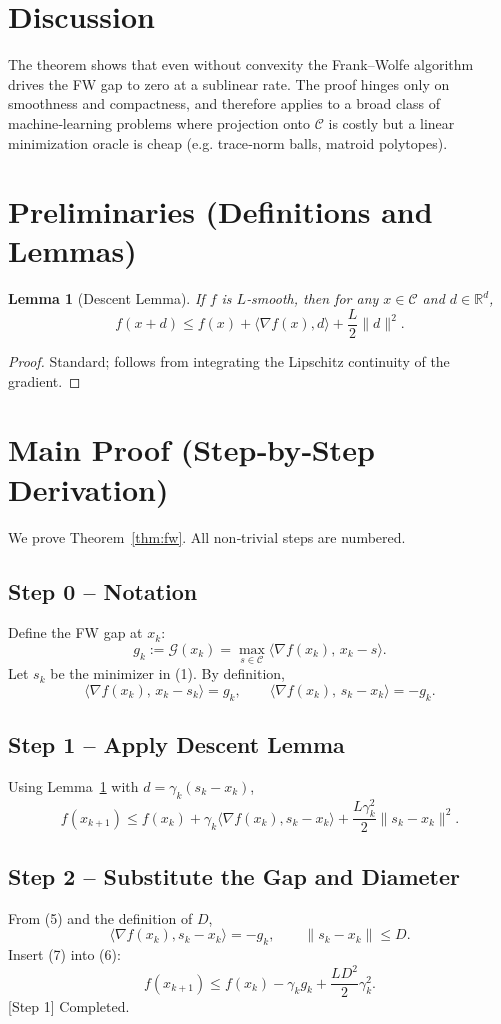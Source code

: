 \documentclass{article}
\newtheorem{lemma}{Lemma}
\newcommand{\gap}{\mathcal{G}}
\begin{document}
\section*{Discussion}
The theorem shows that even without convexity the Frank–Wolfe algorithm
drives the FW gap to zero at a sublinear rate.  The proof hinges only on
smoothness and compactness, and therefore applies to a broad class of
machine‑learning problems where projection onto $\mathcal{C}$ is costly but
a linear minimization oracle is cheap (e.g. trace‑norm balls, matroid
polytopes).

\section*{Preliminaries (Definitions and Lemmas)}
\begin{lemma}[Descent Lemma]\label{lem:descent}
If $f$ is $L$‑smooth, then for any $x\in\mathcal{C}$ and $d\in\mathbb{R}^d$,
\[
f(x+d)\le f(x)+\langle\nabla f(x),d\rangle+\frac{L}{2}\|d\|^{2}.
\]
\end{lemma}
\begin{proof}
Standard; follows from integrating the Lipschitz continuity of the gradient.
\end{proof}

\section*{Main Proof (Step‑by‑Step Derivation)}
We prove Theorem~\ref{thm:fw}.  All non‑trivial steps are numbered.

\subsection*{Step 0 – Notation}
Define the FW gap at $x_k$:
\[
g_k := \gap(x_k)=\max_{s\in\mathcal{C}}\langle \nabla f(x_k),\,x_k-s\rangle .
\tag{4}
\]
Let $s_k$ be the minimizer in (1).  By definition,
\[
\langle \nabla f(x_k),\,x_k-s_k\rangle = g_k,
\qquad
\langle \nabla f(x_k),\,s_k-x_k\rangle = -g_k .
\tag{5}
\]

\subsection*{Step 1 – Apply Descent Lemma}
Using Lemma~\ref{lem:descent} with $d = \gamma_k(s_k-x_k)$,
\[
f(x_{k+1})\le f(x_k)+\gamma_k\langle\nabla f(x_k),s_k-x_k\rangle
               +\frac{L\gamma_k^{2}}{2}\|s_k-x_k\|^{2}.
\tag{6}
\]

\subsection*{Step 2 – Substitute the Gap and Diameter}
From (5) and the definition of $D$,
\[
\langle\nabla f(x_k),s_k-x_k\rangle = -g_k,
\qquad
\|s_k-x_k\|\le D .
\tag{7}
\]
Insert (7) into (6):
\[
f(x_{k+1})\le f(x_k)-\gamma_k g_k+\frac{L D^{2}}{2}\gamma_k^{2}.
\tag{8}
\]
[Step 1] Completed.
\end{document}
